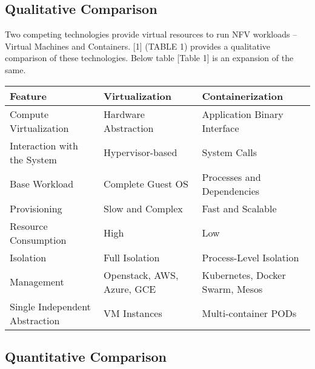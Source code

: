 \documentclass[../seminar.tex]{subfiles}
\begin{document}
\subsection{Qualitative Comparison}
	
\begin{flushleft}
Two competing technologies provide virtual resources to run NFV workloads – Virtual Machines and Containers. [1] (TABLE 1) provides a qualitative comparison of these technologies. Below table [Table 1] is an expansion of the same.

\begin{tabular}{ ||p{4cm}|p{4cm}|p{4cm}|| }
	
\hline
\textbf{Feature} & \textbf{Virtualization} & \textbf{Containerization} \\
\hline\hline
Compute Virtualization & Hardware Abstraction & Application Binary Interface \\
\hline
Interaction with the System & Hypervisor-based & System Calls \\
\hline
Base Workload & Complete Guest OS & Processes and Dependencies \\
\hline
Provisioning & Slow and Complex & Fast and Scalable \\
\hline
Resource Consumption & High & Low \\
\hline
Isolation & Full Isolation & Process-Level Isolation \\
\hline
Management & Openstack, AWS, Azure, GCE & Kubernetes, Docker Swarm, Mesos \\
\hline
Single Independent Abstraction & VM Instances & Multi-container PODs \\
\hline\hline
\end{tabular}
	
\end{flushleft}

\subsection{Quantitative Comparison}

\begin{flushleft}
	


\end{flushleft}
\end{document}
